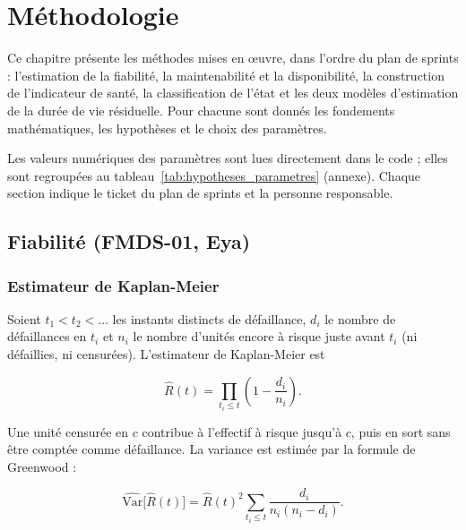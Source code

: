 \chapter{Méthodologie}\label{sec:methodologie}

\chapintro

Ce chapitre présente les méthodes mises en œuvre, dans l'ordre du plan de sprints : l'estimation de la fiabilité, la maintenabilité et la disponibilité, la construction de l'indicateur de santé, la classification de l'état et les deux modèles d'estimation de la durée de vie résiduelle. Pour chacune sont donnés les fondements mathématiques, les hypothèses et le choix des paramètres.

Les valeurs numériques des paramètres sont lues directement dans le code ; elles sont regroupées au tableau~\ref{tab:hypotheses_parametres} (annexe). Chaque section indique le ticket du plan de sprints et la personne responsable.

\section{Fiabilité (FMDS-01, Eya)}\label{sec:fiabilite}

\subsection{Estimateur de Kaplan-Meier}

Soient $t_1 < t_2 < \dots$ les instants distincts de défaillance, $d_i$ le nombre de défaillances en $t_i$ et $n_i$ le nombre d'unités encore à risque juste avant $t_i$ (ni défaillies, ni censurées). L'estimateur de Kaplan-Meier \cite{kaplanmeier1958} est

\begin{equation}\label{eq:km}
\hat R(t) = \prod_{t_i \le t} \left(1 - \frac{d_i}{n_i}\right).
\end{equation}

Une unité censurée en $c$ contribue à l'effectif à risque jusqu'à $c$, puis en sort sans être comptée comme défaillance. La variance est estimée par la formule de Greenwood \cite{greenwood1926} :

\begin{equation}\label{eq:greenwood}
\widehat{\mathrm{Var}}\big[\hat R(t)\big] = \hat R(t)^2 \sum_{t_i \le t} \frac{d_i}{n_i (n_i - d_i)}.
\end{equation}

